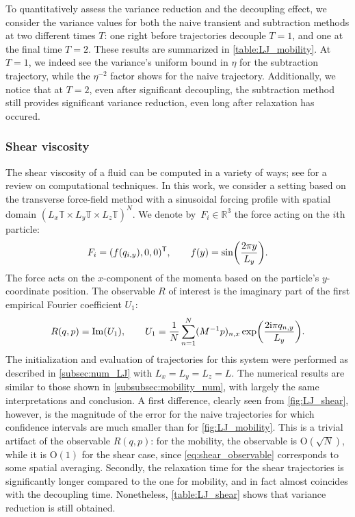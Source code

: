 \documentclass[11pt]{article}
\newcommand{\T}{\mathbb{T}}
\newcommand{\R}{\mathbb{R}}
\newcommand{\bigO}{\mathrm{O}}
\renewcommand{\t}{\mathsf T}
\renewcommand{\Im}{\operatorname{Im}}
\DeclarePairedDelimiter\paren{\lparen}{\rparen}
\theoremstyle{definition}
\begin{document}
To quantitatively assess the variance reduction and the decoupling effect, we consider the variance values for both the naive transient and subtraction methods at two different times $T$: one right before trajectories decouple $T=1$, and one at the final time $T=2$. These results are summarized in \cref{table:LJ_mobility}. At $T=1$, we indeed see the variance's uniform bound in $\eta$ for the subtraction trajectory, while the $\eta^{-2}$ factor shows for the naive trajectory. Additionally, we notice that at $T=2$, even after significant decoupling, the subtraction method still provides significant variance reduction, even long after relaxation has occured.

\subsubsection{Shear viscosity}
\label{subsubsec:shear}
The shear viscosity of a fluid can be computed in a variety of ways; see \cite{todd2007} for a review on computational techniques. In this work, we consider a setting based on the transverse force-field method \cite{gosling1973,joubaud2012} with a sinusoidal forcing profile with spatial domain $(L_x\T \times L_y\T \times L_z\T)^N$. We denote by~$F_i\in\R^3$ the force acting on the $i$th particle:
\begin{equation}
\notag
    F_i = (f(q_{i,y}), 0, 0)^\t, \qquad  f(y) = \sin\paren*{\frac{2\pi y}{L_y}}.
\end{equation}
The force acts on the $x$-component of the momenta based on the particle's $y$-coordinate position.
The observable $R$ of interest is the imaginary part of the first empirical Fourier coefficient $U_1$:
\begin{equation}
    R(q,p) = \Im(U_1), \qquad U_1 = \frac{1}{N}\sum_{n=1}^N (M^{-1}p)_{n,x}\exp\paren*{\frac{2\mathrm{i}\pi q_{n,y}}{L_y}}.
    \label{eq:shear_observable}
\end{equation}
The initialization and evaluation of trajectories for this system were performed as described in \cref{subsec:num_LJ} with $L_x=L_y=L_z=L$. The numerical results are similar to those shown in \cref{subsubsec:mobility_num}, with largely the same interpretations and conclusion. A first difference, clearly seen from \cref{fig:LJ_shear}, however, is the magnitude of the error for the naive trajectories for which confidence intervals are much smaller than for \cref{fig:LJ_mobility}. This is a trivial artifact of the observable $R(q,p)$: for the mobility, the observable is $\bigO(\sqrt{N})$, while it is $\bigO(1)$ for the shear case, since \eqref{eq:shear_observable} corresponds to some spatial averaging. Secondly, the relaxation time for the shear trajectories is significantly longer compared to the one for mobility, and in fact almost coincides with the decoupling time. Nonetheless, \cref{table:LJ_shear} shows that variance reduction is still obtained.
\end{document}
